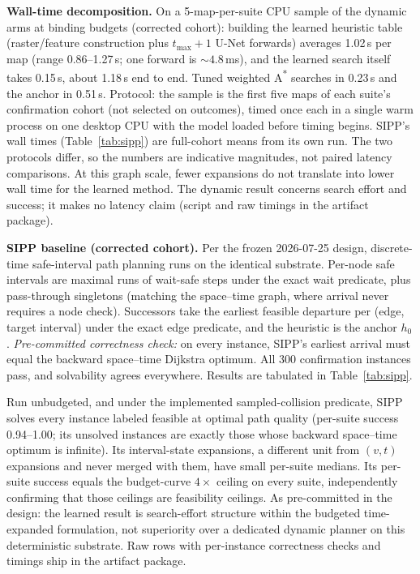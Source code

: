 \documentclass[letterpaper]{article} %
\begin{document}
\textbf{Wall-time decomposition.} On a 5-map-per-suite CPU sample of the dynamic arms at binding budgets (corrected cohort): building the learned heuristic table (raster/feature construction plus $t_{\max}{+}1$ U-Net forwards) averages 1.02\,s per map (range 0.86--1.27\,s; one forward is ${\sim}4.8$\,ms), and the learned search itself takes 0.15\,s, about 1.18\,s end to end. Tuned weighted A\textsuperscript{*} searches in 0.23\,s and the anchor in 0.51\,s. Protocol: the sample is the first five maps of each suite's confirmation cohort (not selected on outcomes), timed once each in a single warm process on one desktop CPU with the model loaded before timing begins. SIPP's wall times (Table~\ref{tab:sipp}) are full-cohort means from its own run. The two protocols differ, so the numbers are indicative magnitudes, not paired latency comparisons. At this graph scale, fewer expansions do not translate into lower wall time for the learned method. The dynamic result concerns search effort and success; it makes no latency claim (script and raw timings in the artifact package).

\textbf{SIPP baseline (corrected cohort).} Per the frozen 2026-07-25 design, discrete-time safe-interval path planning runs on the identical substrate. Per-node safe intervals are maximal runs of wait-safe steps under the exact wait predicate, plus pass-through singletons (matching the space--time graph, where arrival never requires a node check). Successors take the earliest feasible departure per (edge, target interval) under the exact edge predicate, and the heuristic is the anchor $h_0$. \emph{Pre-committed correctness check:} on every instance, SIPP's earliest arrival must equal the backward space--time Dijkstra optimum. All 300 confirmation instances pass, and solvability agrees everywhere. Results are tabulated in Table~\ref{tab:sipp}.

Run unbudgeted, and under the implemented sampled-collision predicate, SIPP solves every instance labeled feasible at optimal path quality (per-suite success 0.94--1.00; its unsolved instances are exactly those whose backward space--time optimum is infinite). Its interval-state expansions, a different unit from $(v,t)$ expansions and never merged with them, have small per-suite medians. Its per-suite success equals the budget-curve $4\times$ ceiling on every suite, independently confirming that those ceilings are feasibility ceilings. As pre-committed in the design: the learned result is search-effort structure within the budgeted time-expanded formulation, not superiority over a dedicated dynamic planner on this deterministic substrate. Raw rows with per-instance correctness checks and timings ship in the artifact package.
\end{document}
